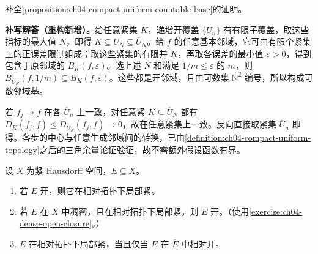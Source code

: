 \documentclass[../../main.tex]{subfiles}%
\begin{document}
\begin{exercise}\label{exercise:ch04-prove-countable-compact-base}
补全\cref{proposition:ch04-compact-uniform-countable-base}的证明。
\end{exercise}
\begin{solution}
\textbf{补写解答（重构新增）。}给任意紧集 $K$，递增开覆盖 $\{U_n\}$ 有有限子覆盖，取这些指标的最大值 $N$，即得 $K\subseteq U_N\subseteq\overline U_N$。给 $f$ 的任意基本邻域，它可由有限个紧集上的正误差限制组成；取这些紧集的有限并 $K$，再取各误差的最小值 $\varepsilon>0$，得到包含于原邻域的 $B_K(f,\varepsilon)$。选上述 $N$ 和满足 $1/m\le\varepsilon$ 的 $m$，则 $B_{\overline U_N}(f,1/m)\subseteq B_K(f,\varepsilon)$。这些都是开邻域，且由可数集 $\mathbb N^2$ 编号，所以构成可数邻域基。

若 $f_j\to f$ 在各 $\overline U_n$ 上一致，对任意紧 $K\subseteq\overline U_N$ 都有 $D_K(f_j,f)\le D_{\overline U_N}(f_j,f)\to0$，故在任意紧集上一致。反向直接取紧集 $\overline U_n$ 即得。各步的中心与任意生成邻域间的转换，已由\cref{definition:ch04-compact-uniform-topology}之后的三角余量论证验证，故不需额外假设函数有界。
\end{solution}
\begin{exercise}\label{exercise:ch04-locally-compact-subsets}
设 $X$ 为紧 Hausdorff 空间，$E\subseteq X$。
\begin{enumerate}
\item\label{item:ch04-open-locally-compact} 若 $E$ 开，则它在相对拓扑下局部紧。
\item\label{item:ch04-dense-locally-compact-open} 若 $E$ 在 $X$ 中稠密，且在相对拓扑下局部紧，则 $E$ 开。（使用\cref{exercise:ch04-dense-open-closure}。）
\item\label{item:ch04-locally-closed-characterization} $E$ 在相对拓扑下局部紧，当且仅当 $E$ 在 $\overline E$ 中相对开。
\end{enumerate}
\end{exercise}
\end{document}
